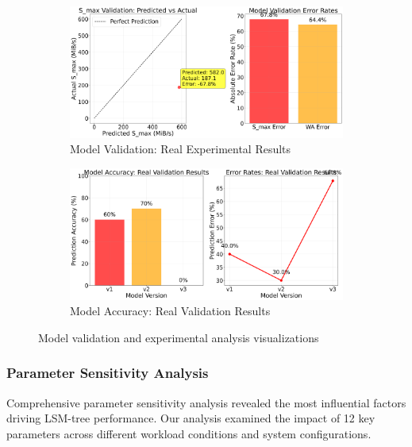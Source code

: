 \documentclass[11pt]{article}
\begin{document}
\begin{figure}[H]
\centering
\begin{subfigure}{0.48\textwidth}
\centering
\includegraphics[width=\textwidth]{experiments/2025-09-05/real_validation_accuracy.png}
\caption{Model Validation: Real Experimental Results}
\label{fig:simulation_vs_real}
\end{subfigure}
\hfill
\begin{subfigure}{0.48\textwidth}
\centering
\includegraphics[width=\textwidth]{experiments/2025-09-05/real_model_accuracy_comparison.png}
\caption{Model Accuracy: Real Validation Results}
\label{fig:model_evolution}
\end{subfigure}
\caption{Model validation and experimental analysis visualizations}
\end{figure}

\subsubsection{Parameter Sensitivity Analysis}
Comprehensive parameter sensitivity analysis revealed the most influential factors driving LSM-tree performance. Our analysis examined the impact of 12 key parameters across different workload conditions and system configurations.
\end{document}
